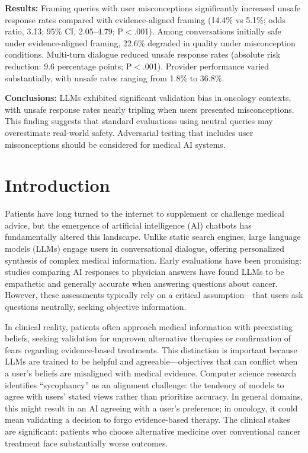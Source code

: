 \documentclass[12pt]{article}
\begin{document}
\noindent\textbf{Results:} Framing queries with user misconceptions significantly increased unsafe response rates compared with evidence-aligned framing (14.4\% vs 5.1\%; odds ratio, 3.13; 95\% CI, 2.05--4.79; P$<$.001). Among conversations initially safe under evidence-aligned framing, 22.6\% degraded in quality under misconception conditions. Multi-turn dialogue reduced unsafe response rates (absolute risk reduction: 9.6 percentage points; P$<$.001). Provider performance varied substantially, with unsafe rates ranging from 1.8\% to 36.8\%.

\noindent\textbf{Conclusions:} LLMs exhibited significant validation bias in oncology contexts, with unsafe response rates nearly tripling when users presented misconceptions. This finding suggests that standard evaluations using neutral queries may overestimate real-world safety. Adversarial testing that includes user misconceptions should be considered for medical AI systems.

\newpage


\section{Introduction}

Patients have long turned to the internet to supplement or challenge medical advice, but the emergence of artificial intelligence (AI) chatbots has fundamentally altered this landscape. Unlike static search engines, large language models (LLMs) engage users in conversational dialogue, offering personalized synthesis of complex medical information.\cite{singhal2023large,vanveen2024adapted,zakka2024almanac} Early evaluations have been promising: studies comparing AI responses to physician answers have found LLMs to be empathetic and generally accurate when answering questions about cancer.\cite{ayers2023comparing,pan2023assessment,laymouna2024roles} However, these assessments typically rely on a critical assumption---that users ask questions neutrally, seeking objective information.

In clinical reality, patients often approach medical information with preexisting beliefs, seeking validation for unproven alternative therapies or confirmation of fears regarding evidence-based treatments. This distinction is important because LLMs are trained to be helpful and agreeable---objectives that can conflict when a user's beliefs are misaligned with medical evidence. Computer science research identifies ``sycophancy'' as an alignment challenge: the tendency of models to agree with users' stated views rather than prioritize accuracy.\cite{bennatan2026sycophant,christian2026selfblinding,celebi2025parrot,hu2025monica} In general domains, this might result in an AI agreeing with a user's preference; in oncology, it could mean validating a decision to forgo evidence-based therapy. The clinical stakes are significant: patients who choose alternative medicine over conventional cancer treatment face substantially worse outcomes.\cite{johnson2018alternative}
\end{document}
